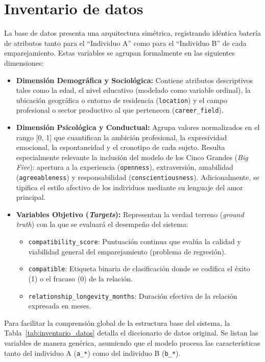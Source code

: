 \section{Inventario de datos}
\label{sec:inventario_datos}
La base de datos presenta una arquitectura simétrica, registrando idéntica batería de atributos tanto para el ``Individuo A'' como para el ``Individuo B'' de cada emparejamiento. Estas variables se agrupan formalmente en las siguientes dimensiones:

\begin{itemize}
    \item \textbf{Dimensión Demográfica y Sociológica:} Contiene atributos descriptivos tales como la edad, el nivel educativo (modelado como variable ordinal), la ubicación geográfica o entorno de residencia (\texttt{location}) y el campo profesional o sector productivo al que pertenecen (\texttt{career\_field}).
    
    \item \textbf{Dimensión Psicológica y Conductual:} Agrupa valores normalizados en el rango [0, 1] que cuantifican la ambición profesional, la expresividad emocional, la espontaneidad y el cronotipo de cada sujeto. Resulta especialmente relevante la inclusión del modelo de los Cinco Grandes (\textit{Big Five}): apertura a la experiencia (\texttt{openness}), extraversión, amabilidad (\texttt{agreeableness}) y responsabilidad (\texttt{conscientiousness}). Adicionalmente, se tipifica el estilo afectivo de los individuos mediante su lenguaje del amor principal.
    
    \item \textbf{Variables Objetivo (\textit{Targets}):} Representan la verdad terreno (\textit{ground truth}) con la que se evaluará el desempeño del sistema:
    \begin{itemize}
        \item \texttt{compatibility\_score}: Puntuación continua que evalúa la calidad y viabilidad general del emparejamiento (problema de regresión).
        \item \texttt{compatible}: Etiqueta binaria de clasificación donde se codifica el éxito (1) o el fracaso (0) de la relación.
        \item \texttt{relationship\_longevity\_months}: Duración efectiva de la relación expresada en meses.
    \end{itemize}
\end{itemize}

Para facilitar la comprensión global de la estructura base del sistema, la Tabla~\ref{tab:inventario_datos} detalla el diccionario de datos original. Se listan las variables de manera genérica, asumiendo que el modelo procesa las características tanto del individuo A (\texttt{a\_*}) como del individuo B (\texttt{b\_*}).

